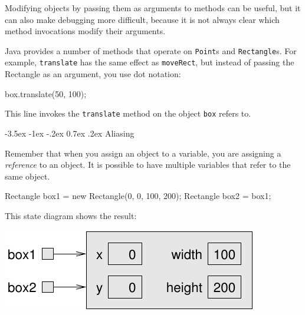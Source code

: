 \documentclass[12pt]{book}
\makeatletter
\theoremstyle{exercise}
\newcommand{\java}[1]{\verb"#1"}
\renewcommand{\section}{\@startsection{section}{1}{\z@}%
    {-3.5ex \@plus -1ex \@minus -.2ex}%
    {0.7ex \@plus.2ex}%
    {\normalfont\Large\bfseries}}
\newcommand{\java}[1]{\lstinline{#1}} %
\makeatother
\begin{document}
Modifying objects by passing them as arguments to methods can be useful, but it can also make debugging more difficult, because it is not always clear which method invocations modify their arguments.

Java provides a number of methods that operate on \java{Point}s and \java{Rectangle}s.
For example, \java{translate} has the same effect as \java{moveRect}, but instead of passing the Rectangle as an argument, you use dot notation:

\begin{code}
    box.translate(50, 100);
\end{code}

This line invokes the \java{translate} method on the object \java{box} refers to.



\section{Aliasing}
\label{aliasing}


Remember that when you assign an object to a variable, you are assigning a {\em reference} to an object.
It is possible to have multiple variables that refer to the same object.

\begin{code}
    Rectangle box1 = new Rectangle(0, 0, 100, 200);
    Rectangle box2 = box1;
\end{code}

This state diagram shows the result:

\begin{center}
\includegraphics{figs/aliasing.pdf}
\end{center}
\end{document}
